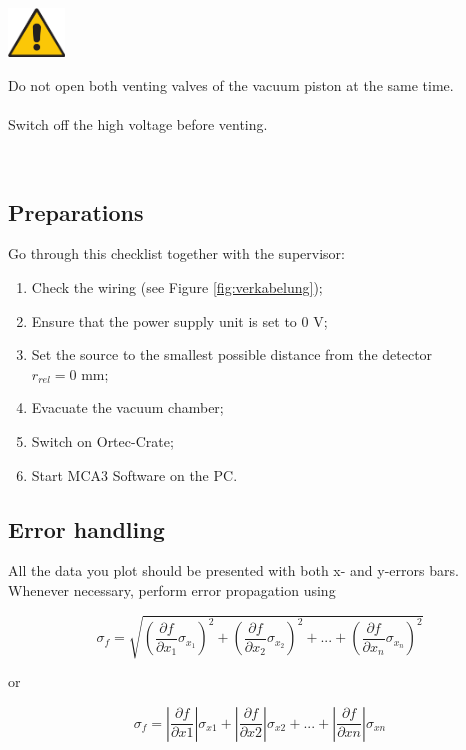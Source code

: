 \begin{minipage}[c]{.15\linewidth}
	\includegraphics[width=1.5cm]{img/attention}
\end{minipage}
\begin{minipage}[t]{.85\linewidth}
	Do not open both venting valves of the vacuum piston at the same time.
	\\ \\
	Switch off the high voltage before venting.
\end{minipage}\vspace{1em}\\ 
%
\clearpage
%
\subsection{Preparations}
Go through this checklist together with the supervisor:
\begin{enumerate}
	\item Check the wiring (see Figure \ref{fig:verkabelung});
	\item Ensure that the power supply unit is set to $0$ V;
	\item Set the source to the smallest possible distance from the detector \\$r_{rel} = 0$ mm;
	\item Evacuate the vacuum chamber;
	\item Switch on Ortec-Crate;
	\item Start MCA3 Software on the PC.
\end{enumerate}
%
\subsection{Error handling}
All the data you plot should be presented with both x- and y-errors bars. Whenever necessary, perform error propagation using

\begin{equation}\label{eq:RSS}
		\sigma_{f} = \sqrt{\left( \frac{\partial f}{\partial x_1}\sigma_{x_1} \right)^2 + \left( \frac{\partial f}{\partial x_2}\sigma_{x_2} \right)^2 + ... + \left( \frac{\partial f}{\partial x_n}\sigma_{x_n} \right)^2} 
\end{equation}

or 

\begin{equation}\label{eq:abs}
		\sigma_{f} = \left| \frac{\partial f}{\partial x1}\right| \sigma_{x1} + \left| \frac{\partial f}{\partial x2}\right| \sigma_{x2} + ... + \left| \frac{\partial f}{\partial xn}\right| \sigma_{xn}
\end{equation}

